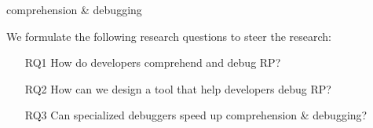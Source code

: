 {\color{red}comprehension \& debugging}

We formulate the following research questions to steer the research: 
\begin{enumerate}
	\item[RQ1] How do developers comprehend and debug RP?
%
	\item[RQ2] How can we design a tool that help developers debug RP?
	\item[RQ3] Can specialized debuggers speed up comprehension \& debugging?
\end{enumerate}
